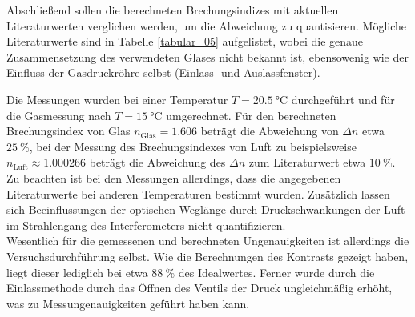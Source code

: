 Abschließend sollen die berechneten Brechungsindizes mit aktuellen
Literaturwerten verglichen werden, um die Abweichung zu quantisieren. Mögliche
Literaturwerte sind in Tabelle \ref{tabular_05} aufgelistet, wobei die genaue
Zusammensetzung des verwendeten Glases nicht bekannt ist, ebensowenig wie der
Einfluss der Gasdruckröhre selbst (Einlass- und Auslassfenster). \\
\FloatBarrier

\FloatBarrier
\noindent Die Messungen wurden bei einer Temperatur $T = \SI{20.5}{\celsius}$ durchgeführt
und für die Gasmessung nach $T = \SI{15}{\celsius}$ umgerechnet. Für den
berechneten Brechungsindex von Glas $n_\text{Glas} = \num{1.606}$ beträgt
die Abweichung von $\Delta n$ etwa $\SI{25}{\percent}$, bei der Messung des Brechungsindexes
von Luft zu beispielsweise $n_\text{Luft} \approx \num{1.000266}$ beträgt die
Abweichung des $\Delta n$ zum Literaturwert etwa $\SI{10}{\percent}$. Zu beachten ist bei den
Messungen allerdings, dass die angegebenen Literaturwerte bei anderen
Temperaturen bestimmt wurden. Zusätzlich lassen sich Beeinflussungen der
optischen Weglänge durch Druckschwankungen der Luft im Strahlengang des
Interferometers nicht quantifizieren. \\
\noindent Wesentlich für die gemessenen und berechneten Ungenauigkeiten ist
allerdings die Versuchsdurchführung selbst. Wie die Berechnungen des Kontrasts
gezeigt haben, liegt dieser lediglich bei etwa $\SI{88}{\percent}$ des
Idealwertes. Ferner wurde durch die Einlassmethode durch das Öffnen des Ventils
der Druck ungleichmäßig erhöht, was zu Messungenauigkeiten geführt haben kann.
